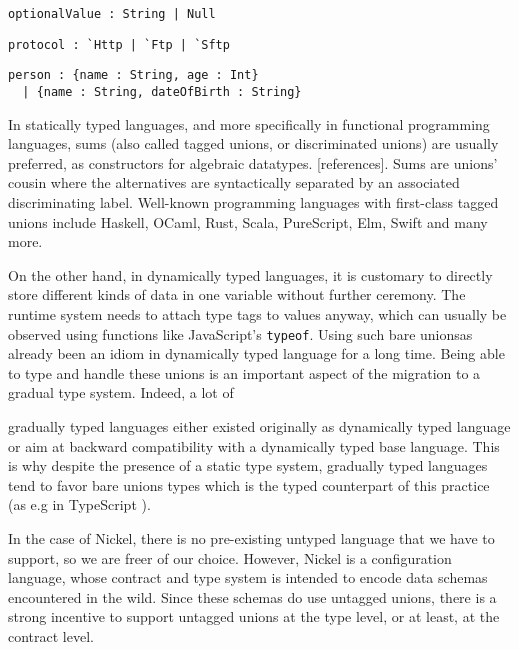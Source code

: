 \documentclass[sigplan,10pt,review,anonymous]{acmart}
\newcommand{\unsure}[2][1=]{}
\newcommand{\resolved}[2]{}
\begin{document}
\label{fig:union-nullable-ex}
\begin{lstlisting}[title={Nullable values}]
optionalValue : String | Null
\end{lstlisting}

\label{fig:union-enum-ex}
\begin{lstlisting}[title={Plain enumeration}]
protocol : `Http | `Ftp | `Sftp
\end{lstlisting}

\label{fig:union-alt-ex}
\begin{lstlisting}[title={Alternative representations}]
person : {name : String, age : Int}
  | {name : String, dateOfBirth : String}
\end{lstlisting}

In statically typed languages, and more specifically in functional programming
languages, sums (also called tagged unions, or discriminated unions) are usually
preferred, as constructors for algebraic datatypes. [references]. Sums are unions' cousin where the alternatives are
syntactically separated by an associated discriminating label. Well-known
programming languages with first-class tagged unions include Haskell, OCaml,
Rust, Scala, PureScript, Elm, Swift and many more.

On the other hand, in dynamically typed languages, it is customary to directly
store different kinds of data in one variable without further ceremony. The
runtime system needs to attach type tags to values anyway, which can usually be
observed using functions like JavaScript's \verb+typeof+. Using such bare
unions\resolved{If you can observe with typeof, then it's pretty much a tagged
union, though the tag is implicit} has already been an idiom in dynamically
typed language for a long time. Being able to type and handle these unions is an
important aspect of the migration to a gradual type system. Indeed, a lot of
\unsure{This is the first time discussing gradual type systems, maybe it should
be introduced earlier, in particular how they relate to contracts
(I think is mentioned on the appendix)}
gradually typed languages either existed originally as dynamically typed
language or aim at backward compatibility with a dynamically typed base
language. This is why despite the presence of a static type system, gradually
typed languages tend to favor bare unions types which is the typed counterpart
of this practice (as e.g in TypeScript \cite{TypeScriptUnions}).

In the case of Nickel, there is no pre-existing untyped language that we have to
support, so we are freer of our choice. However, Nickel is a configuration
language, whose contract and type system is intended to encode data schemas encountered in the wild. Since these schemas do use
untagged unions, there is a strong incentive to support untagged unions at the
type level, or at least, at the contract level.
\end{document}
